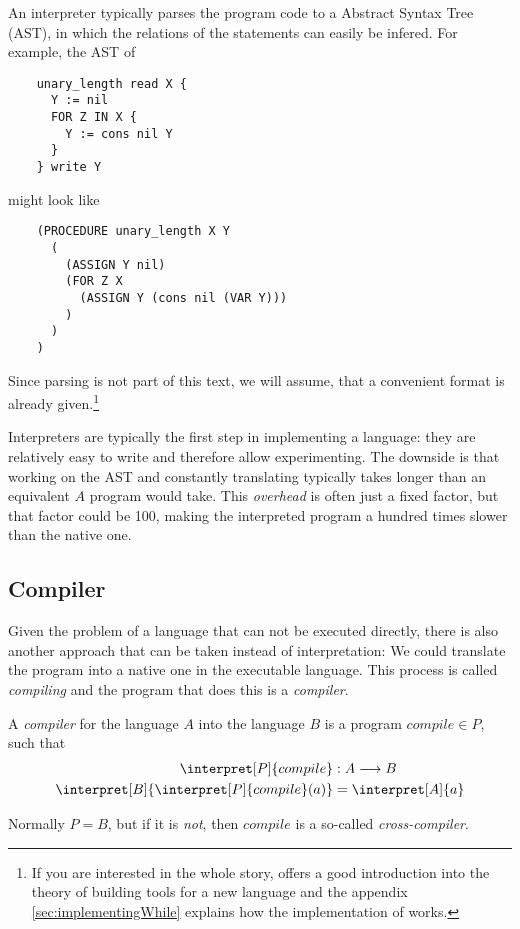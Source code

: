 An interpreter typically parses the program code to a Abstract Syntax Tree 
(AST), in which the relations of the statements can easily be infered. For 
example, the AST of

\begin{verbatim}
	unary_length read X {
	  Y := nil
	  FOR Z IN X {
	    Y := cons nil Y
	  }
	} write Y
\end{verbatim}

might look like

\begin{verbatim}
	(PROCEDURE unary_length X Y
	  (
	    (ASSIGN Y nil)
	    (FOR Z X
	      (ASSIGN Y (cons nil (VAR Y)))
	    )
	  )
	)
\end{verbatim}

Since parsing is not part of this text, we will assume, that a convenient 
format is already given.\footnote{If you are interested in the whole story, 
	\cite{aho2007compilers} offers a good introduction into the theory of
	building tools for a new language and the appendix
	\ref{sec:implementingWhile} explains how the implementation of \WHILE works.}


Interpreters are typically the first step in implementing a language: they 
are relatively easy to write and therefore allow experimenting. The downside 
is that working on the AST and constantly translating typically takes longer 
than an equivalent $A$ program would take. This \emph{overhead} is often 
just a fixed factor, but that factor could be 100, making the interpreted program a 
hundred times slower than the native one.

\subsection{Compiler} %
\label{sub:Compiler}
Given the problem of a language that can not be executed directly, there is 
also another approach that can be taken instead of interpretation: We could 
translate the program into a native one in the executable language. This 
process is called \emph{compiling} and the program that does this is a {\em
compiler}.

\begin{defn}
	A \emph{compiler} for the language $A$ into the language $B$ is a program
	$compile\in P$, such that
	\begin{align*}
		\interpret[P]{compile} &: A \longrightarrow B\\
		\interpret[B]{\interpret[P]{compile}(a)} &= \interpret[A]{a}
	\end{align*}

	Normally $P=B$, but if it is \emph{not}, then $compile$ is a so-called {\em
	cross-compiler}.
\end{defn}

